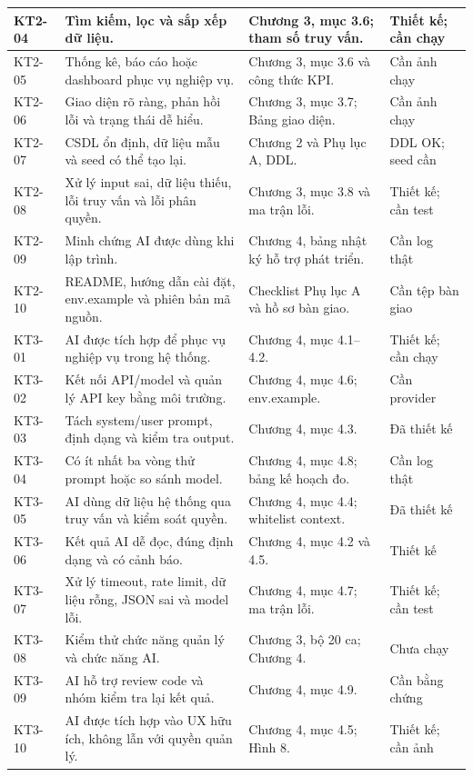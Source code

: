 \begin{longtable}{|C{1.0cm}|L{5.0cm}|L{4.7cm}|L{2.3cm}|}
KT2-04 & Tìm kiếm, lọc và sắp xếp dữ liệu. & Chương 3, mục 3.6; tham số truy vấn. & Thiết kế; cần chạy\\\hline
KT2-05 & Thống kê, báo cáo hoặc dashboard phục vụ nghiệp vụ. & Chương 3, mục 3.6 và công thức KPI. & Cần ảnh chạy\\\hline
KT2-06 & Giao diện rõ ràng, phản hồi lỗi và trạng thái dễ hiểu. & Chương 3, mục 3.7; Bảng giao diện. & Cần ảnh chạy\\\hline
KT2-07 & CSDL ổn định, dữ liệu mẫu và seed có thể tạo lại. & Chương 2 và Phụ lục A, DDL. & DDL OK; seed cần\\\hline
KT2-08 & Xử lý input sai, dữ liệu thiếu, lỗi truy vấn và lỗi phân quyền. & Chương 3, mục 3.8 và ma trận lỗi. & Thiết kế; cần test\\\hline
KT2-09 & Minh chứng AI được dùng khi lập trình. & Chương 4, bảng nhật ký hỗ trợ phát triển. & Cần log thật\\\hline
KT2-10 & README, hướng dẫn cài đặt, env.example và phiên bản mã nguồn. & Checklist Phụ lục A và hồ sơ bàn giao. & Cần tệp bàn giao\\\hline
KT3-01 & AI được tích hợp để phục vụ nghiệp vụ trong hệ thống. & Chương 4, mục 4.1--4.2. & Thiết kế; cần chạy\\\hline
KT3-02 & Kết nối API/model và quản lý API key bằng môi trường. & Chương 4, mục 4.6; env.example. & Cần provider\\\hline
KT3-03 & Tách system/user prompt, định dạng và kiểm tra output. & Chương 4, mục 4.3. & Đã thiết kế\\\hline
KT3-04 & Có ít nhất ba vòng thử prompt hoặc so sánh model. & Chương 4, mục 4.8; bảng kế hoạch đo. & Cần log thật\\\hline
KT3-05 & AI dùng dữ liệu hệ thống qua truy vấn và kiểm soát quyền. & Chương 4, mục 4.4; whitelist context. & Đã thiết kế\\\hline
KT3-06 & Kết quả AI dễ đọc, đúng định dạng và có cảnh báo. & Chương 4, mục 4.2 và 4.5. & Thiết kế\\\hline
KT3-07 & Xử lý timeout, rate limit, dữ liệu rỗng, JSON sai và model lỗi. & Chương 4, mục 4.7; ma trận lỗi. & Thiết kế; cần test\\\hline
KT3-08 & Kiểm thử chức năng quản lý và chức năng AI. & Chương 3, bộ 20 ca; Chương 4. & Chưa chạy\\\hline
KT3-09 & AI hỗ trợ review code và nhóm kiểm tra lại kết quả. & Chương 4, mục 4.9. & Cần bằng chứng\\\hline
KT3-10 & AI được tích hợp vào UX hữu ích, không lẫn với quyền quản lý. & Chương 4, mục 4.5; Hình 8. & Thiết kế; cần ảnh\\\hline

\end{longtable}
